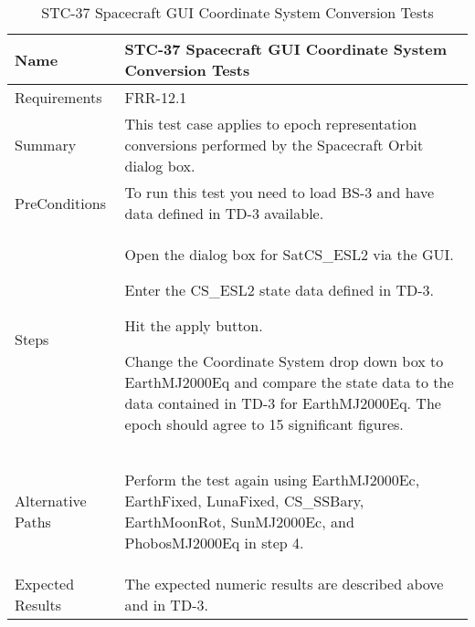 \begin{table}[htbp!]
\centering
      \begin{tabular}{|p{1.05 in} |p{4.75 in} |}
      \hline
         \rowcolor[rgb]{0.8,0.8,0.8} Name & STC-37 Spacecraft GUI Coordinate System Conversion Tests\\
         \hline
         Requirements & FRR-12.1\\ \hline
         Summary &
         This test case applies to epoch representation conversions performed by the Spacecraft Orbit dialog box.  \\
         \hline
         PreConditions & To run this test you need to load BS-3 and have data defined in TD-3 available.\\
         \hline
         Steps &
         \begin{compactenum}
         \item Open the dialog box for SatCS\_ESL2 via the GUI.
         \item Enter the CS\_ESL2 state data  defined in TD-3.
         \item Hit the apply button.
         \item Change the Coordinate System drop down box to EarthMJ2000Eq and compare the state data to
               the data contained in TD-3 for EarthMJ2000Eq. The epoch should agree to 15 significant
               figures.
         \end{compactenum}\\
		 \hline
         Alternative Paths &
         \begin{compactenum}
         \item Perform the test again using  EarthMJ2000Ec, EarthFixed, LunaFixed,  CS\_SSBary, EarthMoonRot, SunMJ2000Ec, and PhobosMJ2000Eq in step 4.
         \end{compactenum}\\
         \hline
         Expected Results & The expected numeric results are described above and in TD-3.\\
      \hline
\end{tabular}
      \label{Table:STC-37}
      \caption{STC-37 Spacecraft GUI Coordinate System Conversion Tests}
\end{table} 